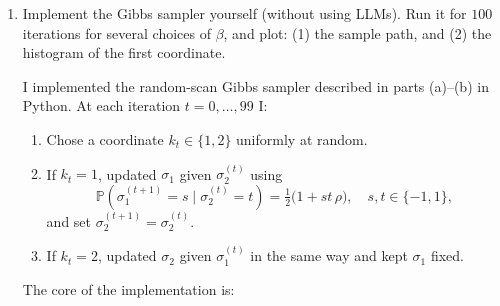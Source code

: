 \documentclass[answers,12pt,addpoints]{exam}
\begin{document}
\begin{enumerate}
\begin{solution}
\medskip
\noindent\textbf{Eigenvalues for $f_1$ and $f_2$.}
Let $f_1(\sigma) = \sigma_1 + \sigma_2$. Under one random-scan Gibbs step,
we update one spin (chosen uniformly) from its conditional distribution.
Using
\[
\mathbb{E}[\sigma_1' \mid \sigma_2] = \rho\,\sigma_2,
\quad
\mathbb{E}[\sigma_2' \mid \sigma_1] = \rho\,\sigma_1,
\]
and the fact that we update each spin with probability $1/2$, we obtain
\[
\mathbb{E}[\sigma_1' \mid \sigma]
= \frac{1}{2}\sigma_1 + \frac{1}{2}\rho\sigma_2,
\quad
\mathbb{E}[\sigma_2' \mid \sigma]
= \frac{1}{2}\rho\sigma_1 + \frac{1}{2}\sigma_2.
\]
Hence
\[
\mathbb{E}[f_1(\sigma') \mid \sigma]
= \mathbb{E}[\sigma_1' + \sigma_2' \mid \sigma]
= \frac{1+\rho}{2}(\sigma_1 + \sigma_2)
= \frac{1+\rho}{2} f_1(\sigma),
\]
so $f_1$ is an eigenfunction with eigenvalue
\[
\lambda_1 = \frac{1+\rho}{2}.
\]
By symmetry of the model, the same calculation holds for
$f_2(\sigma) = \sigma_1 - \sigma_2$, and we obtain another eigenvalue
\[
\lambda_2 = \frac{1+\rho}{2}.
\]

\medskip
\noindent\textbf{Eigenvalue for $f_3$.}
For $f_3(\sigma) = \sigma_1\sigma_2$, a direct matrix multiplication
(or a short calculation of $\mathbb{E}[\sigma_1'\sigma_2' \mid \sigma]$)
shows that
\[
P v_3 = 0\cdot v_3,
\]
so
\[
\lambda_3 = 0.
\]

\medskip
\noindent\textbf{Spectral gap and limit $\beta\to\infty$.}
Thus the four eigenvalues of $P$ are
\[
\lambda_0 = 1,\quad
\lambda_1 = \lambda_2 = \frac{1+\rho}{2},\quad
\lambda_3 = 0.
\]
The spectral gap is defined as
\[
\gamma = 1 - \max\{|\lambda|:\lambda\neq 1\}
= 1 - \max\left\{\frac{1+\rho}{2},\,0\right\}
= 1 - \frac{1+\rho}{2}
= \frac{1-\rho}{2}.
\]
Since $\rho = \tanh\beta \to 1$ as $\beta\to\infty$, we have
\[
\gamma(\beta) = \frac{1-\tanh\beta}{2} \longrightarrow 0
\quad\text{as }\beta\to\infty.
\]
Thus the spectral gap goes to $0$ as $\beta\to\infty$.
    \end{solution}
    \item Implement the Gibbs sampler yourself (without using LLMs). Run it for $100$ iterations for several choices of $\beta$, and plot: (1) the sample path, and (2) the histogram of the first coordinate.\
    \begin{solution}
        I implemented the random-scan Gibbs sampler described in parts (a)--(b) in Python.
At each iteration $t=0,\dots,99$ I:
\begin{enumerate}
    \item Chose a coordinate $k_t \in \{1,2\}$ uniformly at random.
    \item If $k_t=1$, updated $\sigma_1$ given $\sigma_2^{(t)}$ using
    \[
    \mathbb{P}(\sigma_1^{(t+1)} = s \mid \sigma_2^{(t)} = t)
    = \tfrac{1}{2}\bigl(1 + s t\,\rho\bigr), \quad s,t\in\{-1,1\},
    \]
    and set $\sigma_2^{(t+1)}=\sigma_2^{(t)}$.
    \item If $k_t=2$, updated $\sigma_2$ given $\sigma_1^{(t)}$ in the same way
    and kept $\sigma_1$ fixed.
\end{enumerate}
The core of the implementation is:


\end{solution}
\end{enumerate}
\end{document}
